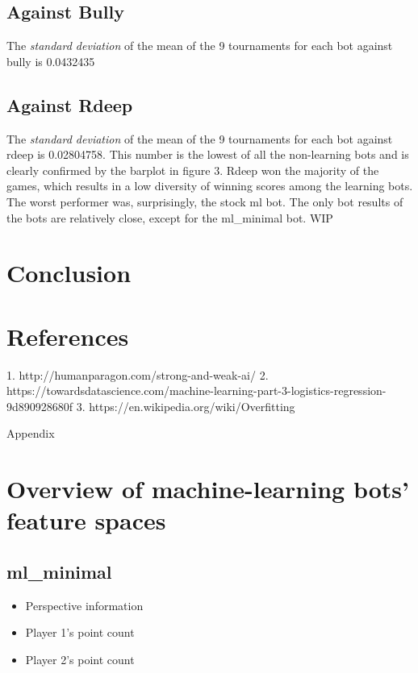 \documentclass[a4paper,11pt]{article}
\begin{document}
\subsection*{Against Bully}
The \textit{standard deviation} of the mean of the 9 tournaments for each bot against bully is 0.0432435

\subsection*{Against Rdeep}
The \textit{standard deviation} of the mean of the 9 tournaments for each bot against rdeep is 0.02804758. This number is the lowest of all the non-learning bots and is clearly confirmed by the barplot in figure 3. Rdeep won the majority of the games, which results in a low diversity of winning scores among the learning bots. The worst performer was, surprisingly, the stock ml bot. The only bot  results of the bots are relatively close, except for the ml\_minimal bot. WIP








\section{Conclusion}






\section{References}
1. http://humanparagon.com/strong-and-weak-ai/
2. https://towardsdatascience.com/machine-learning-part-3-logistics-regression-9d890928680f
3. https://en.wikipedia.org/wiki/Overfitting

Appendix
\section{Overview of machine-learning bots' feature spaces}
\subsection{ml\_minimal}
\begin{itemize}
\item Perspective information
\item Player 1's point count
\item Player 2's point count
\end{itemize}
\end{document}
